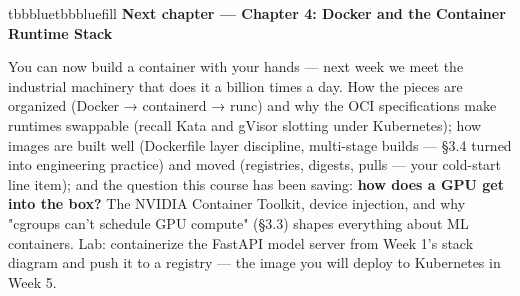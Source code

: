 \begin{calloutbox}{tbbblue}{tbbbluefill}
{\normalsize\bfseries\color{tbbblue}Next chapter — Chapter 4: Docker and the Container Runtime Stack}\par\vspace{3pt}
You can now build a container with your hands — next week we meet the industrial machinery that does it a billion times a day. How the pieces are organized (Docker → containerd → runc) and why the OCI specifications make runtimes swappable (recall Kata and gVisor slotting under Kubernetes); how images are built well (Dockerfile layer discipline, multi-stage builds — §3.4 turned into engineering practice) and moved (registries, digests, pulls — your cold-start line item); and the question this course has been saving: \textbf{how does a GPU get into the box?} The NVIDIA Container Toolkit, device injection, and why "cgroups can't schedule GPU compute" (§3.3) shapes everything about ML containers. Lab: containerize the FastAPI model server from Week 1's stack diagram and push it to a registry — the image you will deploy to Kubernetes in Week 5.
\end{calloutbox}
